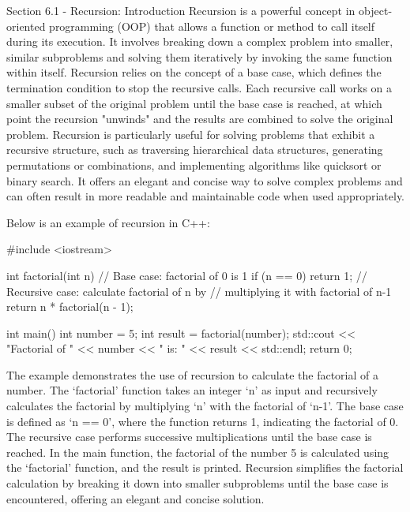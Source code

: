 \begin{notes}{Section 6.1 - Recursion: Introduction}
    Recursion is a powerful concept in object-oriented programming (OOP) that allows a function or method to call itself during its execution. It involves breaking down a complex problem into smaller, similar subproblems and solving them iteratively 
    by invoking the same function within itself. Recursion relies on the concept of a base case, which defines the termination condition to stop the recursive calls. Each recursive call works on a smaller subset of the original problem until the base 
    case is reached, at which point the recursion "unwinds" and the results are combined to solve the original problem. Recursion is particularly useful for solving problems that exhibit a recursive structure, such as traversing hierarchical data structures, 
    generating permutations or combinations, and implementing algorithms like quicksort or binary search. It offers an elegant and concise way to solve complex problems and can often result in more readable and maintainable code when used appropriately.
    
    \begin{highlight}
        Below is an example of recursion in C++:
    
    \begin{code}[C++]
    #include <iostream>

    int factorial(int n) {
    // Base case: factorial of 0 is 1
    if (n == 0) {
        return 1;
    }
    // Recursive case: calculate factorial of n by 
    // multiplying it with factorial of n-1
    return n * factorial(n - 1);
    }

    int main() {
        int number = 5;
        int result = factorial(number);
        std::cout << "Factorial of " << number << " is: " << result << std::endl;
        return 0;
    }
    \end{code}
        The example demonstrates the use of recursion to calculate the factorial of a number. The `factorial' function takes an integer `n' as input and recursively calculates the factorial by multiplying `n' with the factorial of `n-1'. The base case is defined as 
        `n == 0', where the function returns 1, indicating the factorial of 0. The recursive case performs successive multiplications until the base case is reached. In the main function, the factorial of the number 5 is calculated using the `factorial' function, and 
        the result is printed. Recursion simplifies the factorial calculation by breaking it down into smaller subproblems until the base case is encountered, offering an elegant and concise solution.
    \end{highlight}
\end{notes}

